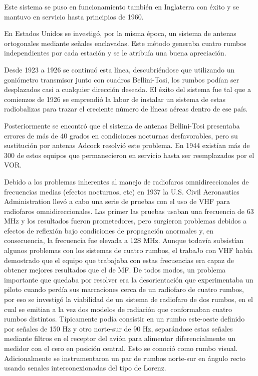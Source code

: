 Este sistema se puso en funcionamiento tambi\'en en Inglaterra con \'exito y se mantuvo en servicio hasta principios de 1960.

En Estados Unidos se investig\'o, por la misma \'epoca, un sistema de antenas ortogonales mediante se\~nales enclavadas. Este m\'etodo generaba cuatro rumbos independientes por cada estaci\'on y se le atribu\'ia una buena apreciaci\'on. 

Desde 1923 a 1926 se continu\'o esta l\'inea, descubri\'endose que utilizando un goni\'ometro transmisor junto con cuadros Bellini-Tosi, los rumbos pod\'ian ser desplazados casi a cualquier direcci\'on deseada. El \'exito del sistema fue tal que a comienzos de 1926 se emprendi\'o la labor de instalar un sistema de estas radiobalizas para trazar el creciente n\'umero de l\'ineas a\'ereas dentro de ese pa\'is. 

Posteriormente se encontr\'o que el sistema de antenas Bellini-Tosi presentaba errores de m\'as de 40 grados en condiciones nocturnas desfavorables, pero su sustituci\'on por antenas Adcock resolvi\'o este problema. En 1944 exist\'ian m\'as de 300 de estos equipos que permanecieron en servicio hasta ser reemplazados por el VOR.


Debido a los problemas inherentes al manejo de radiofaros omnidireccionales de frecuencias medias (efectos nocturnos, etc) en 1937 la U.S. Civil Aeronautics Administration llevó a cabo una serie de pruebas con el uso de VHF para radiofaros omnidireccionales. Las primer las pruebas usaban una frecuencia de 63 MHz y los resultados fueron prometedores, pero surgieron problemas debidos a efectos de reflexión bajo condiciones de propagaci\'on anormales y, en consecuencia, la frecuencia fue elevada a 12S MHz. Aunque todavía subsistían algunos problemas con los sistemas de cuatro rumbos, el trabaJo con VHF había demostrado que el equipo que trabajaba con estas frecuencias era capaz de obtener mejores resultados que el de MF. De todos modos, un problema importante que quedaba por resolver era la desorientación que experimentaba un piloto cuando perdía sus marcaciones cerca de un radiofaro de cuatro rumbos,  por eso se investigó la viabilidad de un sistema de radiofaro de dos rumbos, en el cual se emitian a la vez dos modelos de radiación que conformaban cuatro rumbos distintos. Típicamente podía consistir en un rumbo este-oeste definido por señales de 150 Hz y otro norte-sur de 90 Hz, separándose estas señales mediante filtros en el receptor del avión para alimentar diferencialmente un medidor con el cero en posición central. Esto se conoció como rumbo visual. Adicionalmente se instrumentaron un par de rumbos norte-sur en ángulo recto usando senales interconexionadas del tipo de Lorenz.%

